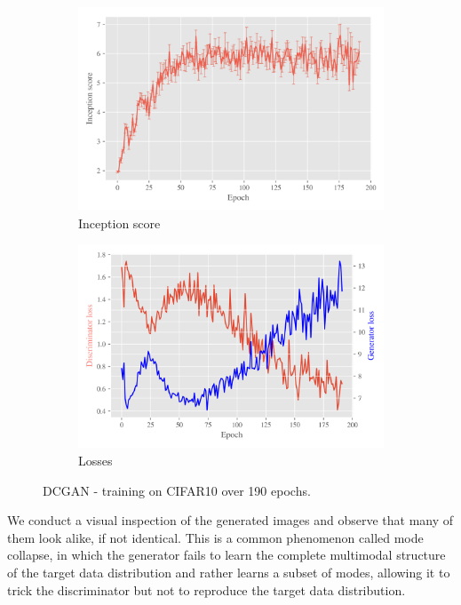 \begin{figure}[H]
    \centering
    \begin{subfigure}[t]{0.49\textwidth}
        \centering
		\includegraphics[width=\textwidth]{../code/results/figures/dcgan_cifar10_is.png}
		\caption{Inception score}
		\label{fig:exp-dcgan-is}
    \end{subfigure}
    \begin{subfigure}[t]{0.49\textwidth}
        \centering
        \includegraphics[width=\textwidth]{../code/results/figures/dcgan_cifar10_losses.png}
		\caption{Losses}
		\label{fig:exp-dcgan-losses}
    \end{subfigure}
    \caption{DCGAN - training on CIFAR10 over 190 epochs.}
\end{figure}
We conduct a visual inspection of the generated images and observe that many of them look alike, if not identical. This is a common phenomenon called mode collapse, in which the generator fails to learn the complete multimodal structure of the target data distribution and rather learns a subset of modes, allowing it to trick the discriminator but not to reproduce the target data distribution.